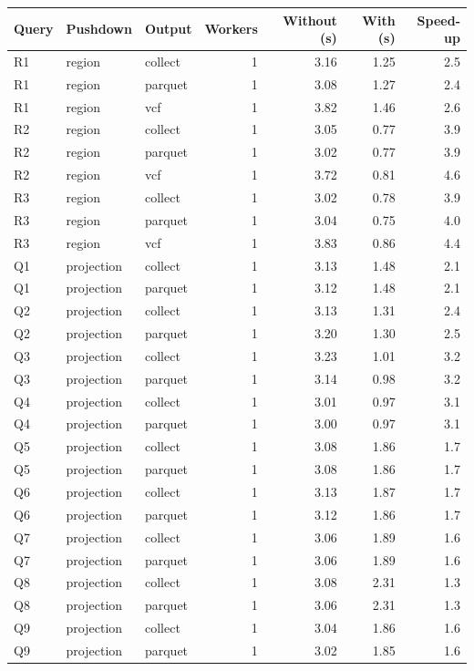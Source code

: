 \begin{tabular}{lllrrrr}
\toprule
Query & Pushdown & Output & Workers & Without (s) & With (s) & Speed-up \\
\midrule
R1 & region & collect & 1 & 3.16 & 1.25 & 2.5 \\
R1 & region & parquet & 1 & 3.08 & 1.27 & 2.4 \\
R1 & region & vcf & 1 & 3.82 & 1.46 & 2.6 \\
R2 & region & collect & 1 & 3.05 & 0.77 & 3.9 \\
R2 & region & parquet & 1 & 3.02 & 0.77 & 3.9 \\
R2 & region & vcf & 1 & 3.72 & 0.81 & 4.6 \\
R3 & region & collect & 1 & 3.02 & 0.78 & 3.9 \\
R3 & region & parquet & 1 & 3.04 & 0.75 & 4.0 \\
R3 & region & vcf & 1 & 3.83 & 0.86 & 4.4 \\
Q1 & projection & collect & 1 & 3.13 & 1.48 & 2.1 \\
Q1 & projection & parquet & 1 & 3.12 & 1.48 & 2.1 \\
Q2 & projection & collect & 1 & 3.13 & 1.31 & 2.4 \\
Q2 & projection & parquet & 1 & 3.20 & 1.30 & 2.5 \\
Q3 & projection & collect & 1 & 3.23 & 1.01 & 3.2 \\
Q3 & projection & parquet & 1 & 3.14 & 0.98 & 3.2 \\
Q4 & projection & collect & 1 & 3.01 & 0.97 & 3.1 \\
Q4 & projection & parquet & 1 & 3.00 & 0.97 & 3.1 \\
Q5 & projection & collect & 1 & 3.08 & 1.86 & 1.7 \\
Q5 & projection & parquet & 1 & 3.08 & 1.86 & 1.7 \\
Q6 & projection & collect & 1 & 3.13 & 1.87 & 1.7 \\
Q6 & projection & parquet & 1 & 3.12 & 1.86 & 1.7 \\
Q7 & projection & collect & 1 & 3.06 & 1.89 & 1.6 \\
Q7 & projection & parquet & 1 & 3.06 & 1.89 & 1.6 \\
Q8 & projection & collect & 1 & 3.08 & 2.31 & 1.3 \\
Q8 & projection & parquet & 1 & 3.06 & 2.31 & 1.3 \\
Q9 & projection & collect & 1 & 3.04 & 1.86 & 1.6 \\
Q9 & projection & parquet & 1 & 3.02 & 1.85 & 1.6 \\

\end{tabular}
